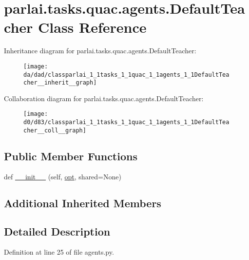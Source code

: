 \hypertarget{classparlai_1_1tasks_1_1quac_1_1agents_1_1DefaultTeacher}{}\section{parlai.\+tasks.\+quac.\+agents.\+Default\+Teacher Class Reference}
\label{classparlai_1_1tasks_1_1quac_1_1agents_1_1DefaultTeacher}


Inheritance diagram for parlai.\+tasks.\+quac.\+agents.\+Default\+Teacher\+:\nopagebreak
\begin{figure}[H]
\begin{center}
\leavevmode
\texttt{[image: da/dad/classparlai\_1\_1tasks\_1\_1quac\_1\_1agents\_1\_1DefaultTeacher\_\_inherit\_\_graph]}
\end{center}
\end{figure}


Collaboration diagram for parlai.\+tasks.\+quac.\+agents.\+Default\+Teacher\+:\nopagebreak
\begin{figure}[H]
\begin{center}
\leavevmode
\texttt{[image: d0/d83/classparlai\_1\_1tasks\_1\_1quac\_1\_1agents\_1\_1DefaultTeacher\_\_coll\_\_graph]}
\end{center}
\end{figure}
\subsection*{Public Member Functions}
\begin{DoxyCompactItemize}
\item 
def \hyperlink{classparlai_1_1tasks_1_1quac_1_1agents_1_1DefaultTeacher_a45c9f1c71c4c5c93e7fe32685a8fd4e9}{\+\_\+\+\_\+init\+\_\+\+\_\+} (self, \hyperlink{classparlai_1_1core_1_1agents_1_1Teacher_a3ce6243860ce978a897922863ed32fa4}{opt}, shared=None)
\end{DoxyCompactItemize}
\subsection*{Additional Inherited Members}


\subsection{Detailed Description}


Definition at line 25 of file agents.\+py.



